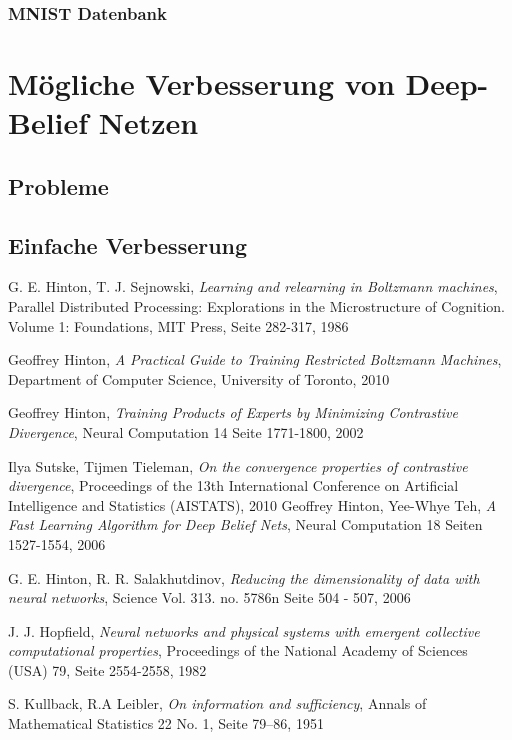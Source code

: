 \documentclass[12pt]{article}
\begin{document}
	\subsubsection{MNIST Datenbank}
	
	\section{Mögliche Verbesserung von Deep-Belief Netzen}
	\subsection{Probleme}

\subsection{Einfache Verbesserung}

\newpage
\begin{thebibliography}{9}

G. E. Hinton, T. J. Sejnowski,
\emph{Learning and relearning in Boltzmann machines}, 
Parallel Distributed Processing: Explorations in the Microstructure of Cognition. Volume 1: Foundations, MIT Press, Seite 282-317, 1986

Geoffrey Hinton,
\emph{A Practical Guide to Training Restricted Boltzmann Machines},
Department of Computer Science, 
University of Toronto,
2010

Geoffrey Hinton,
\emph{Training Products of Experts by Minimizing Contrastive Divergence},
Neural Computation 14 Seite 1771-1800,
2002

Ilya Sutske, Tijmen Tieleman,
\emph{On the convergence properties of contrastive divergence},
Proceedings of the 13th International Conference on Artificial Intelligence and Statistics (AISTATS),
2010 
Geoffrey Hinton, Yee-Whye Teh,
\emph{A Fast Learning Algorithm for Deep Belief Nets},
Neural Computation 18 Seiten 1527-1554,
2006

G. E. Hinton, R. R. Salakhutdinov,
\emph{Reducing the dimensionality of data with neural networks},
Science Vol. 313. no. 5786n Seite 504 - 507,
2006

J. J. Hopfield,
 \emph{Neural networks and physical systems with emergent collective computational properties},
Proceedings of the National Academy of Sciences (USA) 79, Seite 2554-2558,
1982

 S. Kullback, R.A Leibler,
\emph{On information and sufficiency},
Annals of Mathematical Statistics 22 No. 1,
Seite  79–86,
 1951
\end{thebibliography}
\newpage
\listoffigures
\end{document}
